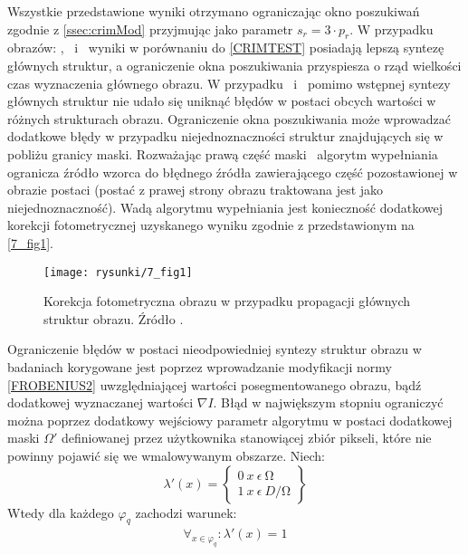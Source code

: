 \documentclass[12pt, twoside, openany]{report}
\theoremstyle{definition}
\begin{document}
Wszystkie przedstawione wyniki otrzymano ograniczając okno poszukiwań zgodnie z \autoref{ssec:crimMod} przyjmując jako parametr $s_r = 3 \cdot 	p_r$. W przypadku obrazów: \ObrVIm , \ObrXVIIm \ i \ObrXIXm \ wyniki w porównaniu do \autoref{CRIMTEST} posiadają lepszą syntezę głównych struktur, a ograniczenie okna poszukiwania przyspiesza o rząd wielkości czas wyznaczenia głównego obrazu. W przypadku \ObrXVm \ i \ObrXIIIm \ pomimo wstępnej syntezy głównych struktur nie udało się uniknąć błędów w postaci obcych wartości w różnych strukturach obrazu. Ograniczenie okna poszukiwania może wprowadzać dodatkowe błędy w przypadku niejednoznaczności struktur znajdujących się w pobliżu granicy maski. Rozważając prawą część maski \ObrXVIIm \ algorytm wypełniania ogranicza źródło wzorca do błędnego źródła zawierającego część pozostawionej w obrazie postaci (postać z prawej strony obrazu traktowana jest jako niejednoznaczność). Wadą algorytmu wypełniania jest konieczność dodatkowej korekcji fotometrycznej uzyskanego wyniku zgodnie z \cite{StructurePropagationManual} przedstawionym na \autoref{7_fig1}. 
\begin{figure}[!h]
	\centering
	\texttt{[image: rysunki/7\_fig1]}
	\caption{Korekcja fotometryczna obrazu w przypadku propagacji głównych struktur obrazu. Źródło \cite{StructurePropagationManual}.}
	\label{7_fig1} 
\end{figure}
Ograniczenie błędów w postaci nieodpowiedniej syntezy struktur obrazu w badaniach korygowane jest poprzez wprowadzanie modyfikacji normy \eqref{FROBENIUS2} uwzględniającej wartości posegmentowanego obrazu, bądź dodatkowej wyznaczanej wartości $\nabla I$. Błąd w największym stopniu ograniczyć można poprzez dodatkowy wejściowy parametr algorytmu w postaci dodatkowej maski $\Omega '$ definiowanej przez użytkownika stanowiącej zbiór pikseli, które nie powinny pojawić się we wmalowywanym obszarze. Niech:
\begin{equation}
{\lambda }'\left(x\right)=\left\{ \begin{array}{c}
0\ x\ \epsilon \ \mathrm{\Omega } \\ 
1\ x\ \epsilon \ D/\mathrm{\Omega } \end{array}
\right\}
\end{equation}
Wtedy dla każdego ${\varphi }_q$ zachodzi warunek:
\begin{align}
\forall_{x \in {\varphi }_q}: {\lambda }'(x) = 1
\end{align}
\end{document}

